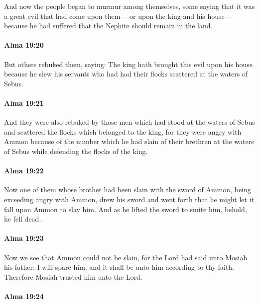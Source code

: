 			And now the people began to murmur among themselves,
			some saying that it was a great evil that had come upon them
			---or upon the king and his house---
			because he had suffered that the Nephite should remain in the land.

		\paragraph{Alma 19:20} %
			\label{ALMA-19-20}

			But others rebuked them, saying:
			The king hath brought this evil upon his house
			because he slew his servants
			who had had their flocks scattered at the waters of Sebus.

		\paragraph{Alma 19:21} %
			\label{ALMA-19-21}

			And they were also rebuked by those men
			which had stood at the waters of Sebus and scattered the flocks
			which belonged to the king,
			for they were angry with Ammon because of the number
			which he had slain of their brethren at the waters of Sebus
			while defending the flocks of the king.

		\paragraph{Alma 19:22} %
			\label{ALMA-19-22}

			Now one of them whose brother had been slain with the sword of Ammon,
			being exceeding angry with Ammon,
			drew his sword and went forth
			that he might let it fall upon Ammon to slay him.
			And as he lifted the sword to smite him,
			behold, he fell dead.

		\paragraph{Alma 19:23} %
			\label{ALMA-19-23}

			Now we see that Ammon could not be slain,
			for the Lord had said unto Mosiah his father:
			I will spare him, and it shall be unto him according to thy faith.
			Therefore Mosiah trusted him unto the Lord.

		\paragraph{Alma 19:24} %
			\label{ALMA-19-24}

